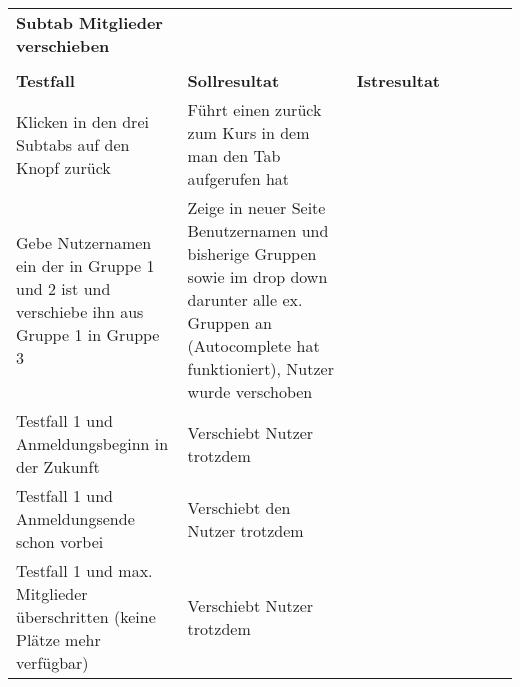 \begin{table}[]
\begin{tabular}{p{6cm}p{7cm}p{3cm}llll}
	
			\textbf{Subtab Mitglieder verschieben}                                                                                                        &                                                                                                                                                                  &             &  &  &  \\
		&                                                                                                                                                                  &             &  &  &  \\
			\textbf{Testfall }                                                                                                                            &       	\textbf{Sollresultat}                                                                                                                                                           &      	\textbf{Istresultat}       &  &  &  \\
		Klicken in den drei Subtabs auf den Knopf zurück                                                                                     & Führt einen zurück zum Kurs in dem man den Tab aufgerufen hat                                                                                                    & \checkmark           &  &  &  \\
		Gebe Nutzernamen ein der in Gruppe 1 und 2 ist und verschiebe ihn aus Gruppe 1 in Gruppe 3                                           & Zeige in neuer Seite Benutzernamen und bisherige Gruppen sowie im drop down darunter alle ex. Gruppen an (Autocomplete hat funktioniert), Nutzer wurde verschoben & \checkmark           &  &  &  \\
		Testfall 1 und Anmeldungsbeginn in der Zukunft                                                                                       & Verschiebt Nutzer trotzdem                                                                                                                                       & \checkmark           &  &  &  \\
		Testfall 1 und Anmeldungsende schon vorbei                                                                                           & Verschiebt den Nutzer trotzdem                                                                                                                                   & \checkmark           &  &  &  \\
		Testfall 1 und max. Mitglieder überschritten (keine Plätze mehr verfügbar)                                                           & Verschiebt Nutzer trotzdem                                                                                                                                       & \checkmark           &  &  &  \\

\end{tabular}
\end{table}
